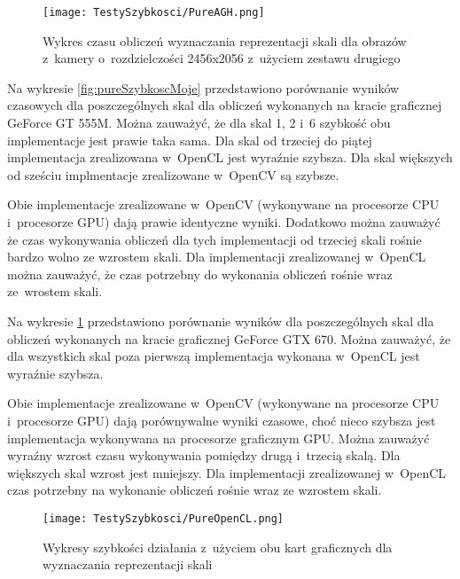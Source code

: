 \begin{figure}[h]
\begin{center}
\texttt{[image: TestySzybkosci/PureAGH.png]}
\end{center}
\caption{Wykres czasu obliczeń wyznaczania reprezentacji skali dla obrazów z~kamery o~rozdzielczości 2456x2056 z~użyciem zestawu drugiego}
\label{fig:pureSzybkoscAGH}
\end{figure}

Na wykresie \ref{fig:pureSzybkoscMoje} przedstawiono porównanie wyników czasowych dla poszczególnych skal dla obliczeń wykonanych na kracie graficznej GeForce GT 555M. Można zauważyć, że dla skal 1, 2 i~6 szybkość obu implementacje jest prawie taka sama. Dla skal od trzeciej do piątej implementacja zrealizowana w~OpenCL jest wyraźnie szybsza. Dla skal większych od sześciu implmentacje zrealizowane w~OpenCV są szybsze.

Obie implementacje zrealizowane w~OpenCV (wykonywane na procesorze CPU i~procesorze GPU) dają prawie identyczne wyniki. Dodatkowo można zauważyć że czas wykonywania obliczeń dla tych implementacji od trzeciej skali rośnie bardzo wolno ze wzrostem skali. Dla implementacji zrealizowanej w~OpenCL można zauważyć, że czas potrzebny do wykonania obliczeń rośnie wraz ze~wrostem skali.

Na wykresie \ref{fig:pureSzybkoscAGH} przedstawiono porównanie wyników dla poszczególnych skal dla obliczeń wykonanych na kracie graficznej GeForce GTX 670. Można zauważyć, że dla wszystkich skal poza pierwszą implementacja wykonana w~OpenCL jest wyraźnie szybsza.

Obie implementacje zrealizowane w~OpenCV (wykonywane na procesorze CPU i~procesorze GPU) dają porównywalne wyniki czasowe, choć nieco szybsza jest implementacja wykonywana na procesorze graficznym GPU. Można zauważyć wyraźny wzrost czasu wykonywania pomiędzy drugą i~trzecią skalą. Dla większych skal wzrost jest mniejszy. Dla implementacji zrealizowanej w~OpenCL czas potrzebny na wykonanie obliczeń rośnie wraz ze wzrostem skali. 

\begin{figure}[h]
\begin{center}
\texttt{[image: TestySzybkosci/PureOpenCL.png]}
\end{center}
\caption{Wykresy szybkości działania z~użyciem obu kart graficznych dla wyznaczania reprezentacji skali}
\label{fig:pureOpenCL}
\end{figure}

